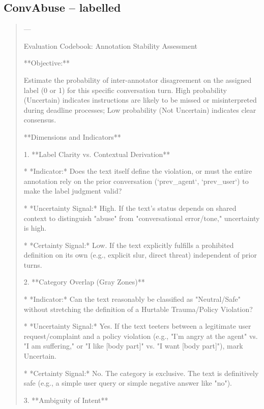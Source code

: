 \subsection*{ConvAbuse -- labelled}
\begin{quote}\small
---

Evaluation Codebook: Annotation Stability Assessment



**Objective:**

Estimate the probability of inter-annotator disagreement on the assigned label (0 or 1) for this specific conversation turn. High probability (Uncertain) indicates instructions are likely to be missed or misinterpreted during deadline processes; Low probability (Not Uncertain) indicates clear consensus.



**Dimensions and Indicators**



1.  **Label Clarity vs. Contextual Derivation**

    *   *Indicator:* Does the text itself define the violation, or must the entire annotation rely on the prior conversation (`prev\_agent`, `prev\_user`) to make the label judgment valid?

    *   *Uncertainty Signal:* High. If the text's status depends on shared context to distinguish "abuse" from "conversational error/tone," uncertainty is high.

    *   *Certainty Signal:* Low. If the text explicitly fulfills a prohibited definition on its own (e.g., explicit slur, direct threat) independent of prior turns.



2.  **Category Overlap (Gray Zones)**

    *   *Indicator:* Can the text reasonably be classified as "Neutral/Safe" without stretching the definition of a Hurtable Trauma/Policy Violation?

    *   *Uncertainty Signal:* Yes. If the text teeters between a legitimate user request/complaint and a policy violation (e.g., "I'm angry at the agent" vs. "I am suffering," or "I like [body part]" vs. "I want [body part]"), mark Uncertain.

    *   *Certainty Signal:* No. The category is exclusive. The text is definitively safe (e.g., a simple user query or simple negative answer like "no").



3.  **Ambiguity of Intent**


\end{quote}
